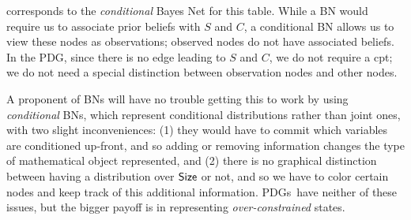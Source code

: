 \documentclass{article}
\newcommand{\MN}{PDG}
\newcommand{\MNs}{\MN s}
\numberwithin{equation}{section}
\begin{document}
\begin{example}
		corresponds to the \emph{conditional} Bayes Net \parencite{koller2009probabilistic} for this table.
		While a BN would require us to associate prior beliefs with $S$ and
		$C$, a conditional BN allows us to view these nodes as
		observations; observed nodes do not have associated beliefs.
		In the \MN, since there is no edge leading to $S$ and $C$, we
		do not require a cpt; we do not need a special distinction between
		observation nodes and other nodes.
				
		\begin{vfull}
			A proponent of BNs will have no trouble getting this to work by using \emph{conditional} BNs, which represent conditional distributions rather than joint ones, with two slight inconveniences: (1) they would have to commit which variables are conditioned up-front, and so adding or removing information changes the type of mathematical object represented, and (2) there is no graphical distinction between having a distribution over $\sf Size$ or not, and so we have to color certain nodes and keep track of this additional information. \MNs\ have neither of these issues, but the bigger payoff is in representing \textit{over-constrained} states.
		\end{vfull}
	

\end{example}
\end{document}
